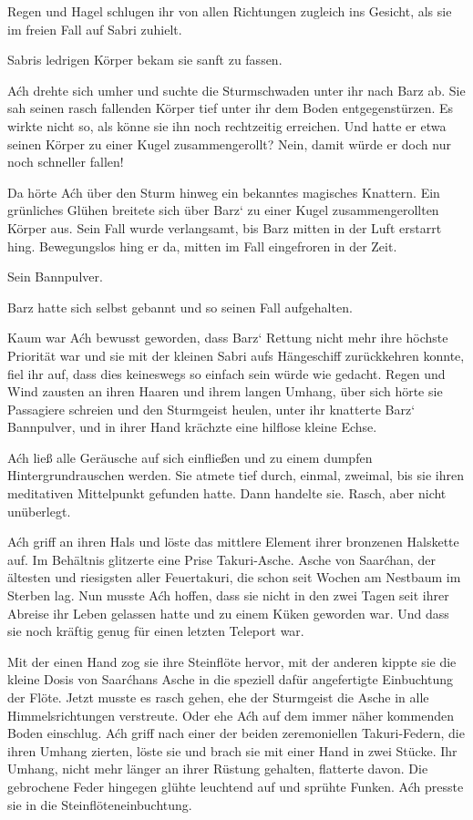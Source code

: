 Regen und Hagel schlugen ihr von allen Richtungen zugleich ins Gesicht, als sie im freien Fall auf Sabri zuhielt.

Sabris ledrigen Körper bekam sie sanft zu fassen.

Aćh drehte sich umher und suchte die Sturmschwaden unter ihr nach Barz ab. Sie sah seinen rasch fallenden Körper tief unter ihr dem Boden entgegenstürzen. Es wirkte nicht so, als könne sie ihn noch rechtzeitig erreichen. Und hatte er etwa seinen Körper zu einer Kugel zusammengerollt? Nein, damit würde er doch nur noch schneller fallen!

Da hörte Aćh über den Sturm hinweg ein bekanntes magisches Knattern. Ein grünliches Glühen breitete sich über Barz‘ zu einer Kugel zusammengerollten Körper aus. Sein Fall wurde verlangsamt, bis Barz mitten in der Luft erstarrt hing. Bewegungslos hing er da, mitten im Fall eingefroren in der Zeit.

Sein Bannpulver.

Barz hatte sich selbst gebannt und so seinen Fall aufgehalten.

Kaum war Aćh bewusst geworden, dass Barz‘ Rettung nicht mehr ihre höchste Priorität war und sie mit der kleinen Sabri aufs Hängeschiff zurückkehren konnte, fiel ihr auf, dass dies keineswegs so einfach sein würde wie gedacht. Regen und Wind zausten an ihren Haaren und ihrem langen Umhang, über sich hörte sie Passagiere schreien und den Sturmgeist heulen, unter ihr knatterte Barz‘ Bannpulver, und in ihrer Hand krächzte eine hilflose kleine Echse.

Aćh ließ alle Geräusche auf sich einfließen und zu einem dumpfen Hintergrundrauschen werden. Sie atmete tief durch, einmal, zweimal, bis sie ihren meditativen Mittelpunkt gefunden hatte. Dann handelte sie. Rasch, aber nicht unüberlegt.

Aćh griff an ihren Hals und löste das mittlere Element ihrer bronzenen Halskette auf. Im Behältnis glitzerte eine Prise Takuri-Asche. Asche von Saarćhan, der ältesten und riesigsten aller Feuertakuri, die schon seit Wochen am Nestbaum im Sterben lag. Nun musste Aćh hoffen, dass sie nicht in den zwei Tagen seit ihrer Abreise ihr Leben gelassen hatte und zu einem Küken geworden war. Und dass sie noch kräftig genug für einen letzten Teleport war.

Mit der einen Hand zog sie ihre Steinflöte hervor, mit der anderen kippte sie die kleine Dosis von Saarćhans Asche in die speziell dafür angefertigte Einbuchtung der Flöte. Jetzt musste es rasch gehen, ehe der Sturmgeist die Asche in alle Himmelsrichtungen verstreute. Oder ehe Aćh auf dem immer näher kommenden Boden einschlug. Aćh griff nach einer der beiden zeremoniellen Takuri-Federn, die ihren Umhang zierten, löste sie und brach sie mit einer Hand in zwei Stücke. Ihr Umhang, nicht mehr länger an ihrer Rüstung gehalten, flatterte davon. Die gebrochene Feder hingegen glühte leuchtend auf und sprühte Funken. Aćh presste sie in die Steinflöteneinbuchtung.


